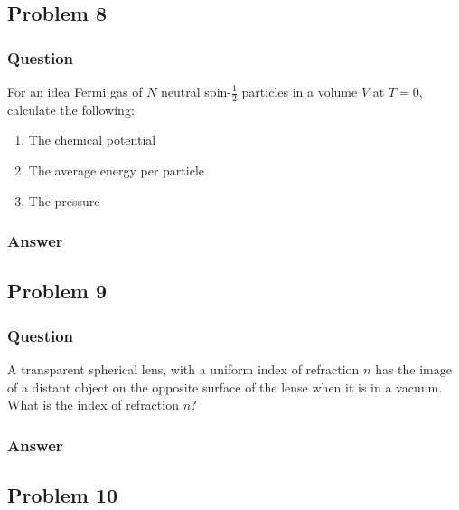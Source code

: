 \subsection{Problem 8}
\subsubsection{Question}

For an idea Fermi gas of $N$ neutral spin-$\frac 12$ particles in a volume 
$V$ at $T = 0$, calculate the following:
\begin{enumerate}
	\item The chemical potential
	\item The average energy per particle
	\item The pressure
\end{enumerate}

\subsubsection{Answer}

\clearpage
\subsection{Problem 9}
\subsubsection{Question}
	\index{}

A transparent spherical lens, with a uniform index of refraction $n$ has the 
image of a distant object on the opposite surface of the lense when it is in 
a vacuum. What is the index of refraction $n$?

\subsubsection{Answer}

\clearpage
\subsection{Problem 10}
